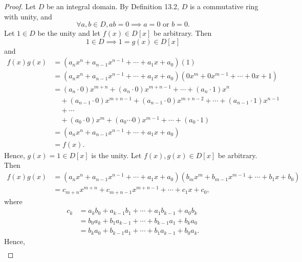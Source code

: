 \documentclass{article}
\newtheorem{theorem}{Theorem}[section]
\theoremstyle{definition}
\begin{document}
\noindent{}

\begin{proof}
      Let $D$ be an integral domain. By Definition 13.2, $D$ is a commutative ring with unity, and
      \begin{equation*}
          \forall a,b \in D, ab=0 \implies a=0 \text{ or } b=0.
      \end{equation*}
      Let $1\in D$ be the unity and let $f(x)\in D[x]$ be arbitrary. Then
      \begin{equation*}
          1\in D \implies 1=g(x)\in D[x]
      \end{equation*}
      and
      \begin{align*}
          f(x)g(x)&=(a_nx^n+a_{n-1}x^{n-1}+\cdots+a_1x+a_0)(1) \\
          &=(a_nx^n+a_{n-1}x^{n-1}+\cdots+a_1x+a_0)(0x^m+0x^{m-1}+\cdots+0x+1) \\
          &=(a_n\cdot0)x^{m+n}+(a_n\cdot0)x^{m+n-1}+\cdots+(a_n\cdot1)x^n \\
          & \quad + (a_{n-1}\cdot0)x^{m+n-1}+(a_{n-1}\cdot0)x^{m+n-2}+\cdots+(a_{n-1}\cdot1)x^{n-1} \\
          & \quad + \cdots \\
          & \quad + (a_0\cdot0)x^m + (a_0\cdots0)x^{m-1} + \cdots +(a_0\cdot1) \\
          &= (a_nx^n+a_{n-1}x^{n-1}+\cdots+a_1x+a_0) \\ 
          &=f(x).
      \end{align*}
      Hence, $g(x)=1\in D[x]$ is the unity. Let $f(x),g(x) \in D[x]$ be arbitrary. Then
      \begin{align*}
          f(x)g(x) &= (a_nx^n+a_{n-1}x^{n-1}+\cdots+a_1x+a_0)(b_mx^m+b_{m-1}x^{m-1}+\cdots+b_1x+b_0) \\
          &= c_{m+n}x^{m+n}+c_{m+n-1}x^{m+n-1}+\cdots+c_1x+c_0,
      \end{align*}
      where
      \begin{align*}
          c_k &= a_kb_0+a_{k-1}b_1+\cdots+a_1b_{k-1}+a_0b_k \\
          &= b_0a_k+b_1a_{k-1}+\cdots+b_{k-1}a_1+b_ka_0 \\
          &= b_ka_0+b_{k-1}a_1+\cdots+b_1a_{k-1}+b_0a_k.
      \end{align*}
      Hence,
      \begin{align*}

\end{align*}
\end{proof}
\end{document}
